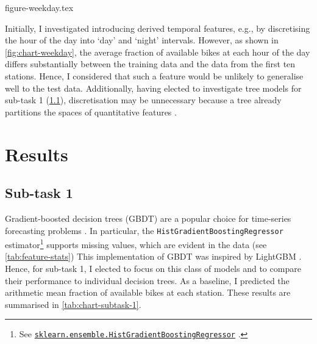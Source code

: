 \documentclass[11pt]{extarticle}
\newcommand{\sklearn}[1]{
  \href{https://scikit-learn.org/stable/modules/generated/sklearn.#1.html}{\lstinline|sklearn.#1|}
}
\begin{document}
{figure-weekday.tex}

Initially, I investigated introducing derived temporal features, e.g., by discretising
the hour of the day into `day' and `night' intervals.
However, as shown in \cref{fig:chart-weekday}, the average fraction of available bikes
at each hour of the day differs substantially between the training data and the data
from the first ten stations.
Hence, I considered that such a feature would be unlikely to generalise well to the
test data.
Additionally, having elected to investigate tree models for sub-task 1
(\cref{sec:results-subtask-1}), discretisation may be unnecessary because a tree
already partitions the spaces of quantitative features \parencite[155]{Flach2012}.

\section{Results}
\label{sec:results}

\subsection{Sub-task 1}
\label{sec:results-subtask-1}

Gradient-boosted decision trees (GBDT) are a popular choice for time-series forecasting
problems \parencite{Bojer2021}.
In particular, the \texttt{HistGradientBoostingRegressor}
estimator\footnote{See \sklearn{ensemble.HistGradientBoostingRegressor}.} supports
missing values, which are evident in the data (see \cref{tab:feature-stats})
This implementation of GBDT was inspired by LightGBM \parencite{Ke2017}.
Hence, for sub-task 1, I elected to focus on this class of models and to compare their
performance to individual decision trees.
As a baseline, I predicted the arithmetic mean fraction of available bikes at each station.
These results are summarised in \cref{tab:chart-subtask-1}.
\end{document}
